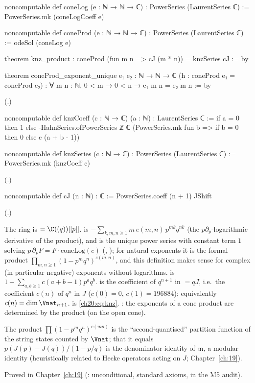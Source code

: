 \begin{leancode}
noncomputable def coneLog (e : ℕ → ℕ → ℂ) : PowerSeries (LaurentSeries ℂ) :=
  PowerSeries.mk (coneLogCoeff e)

noncomputable def coneProd (e : ℕ → ℕ → ℂ) : PowerSeries (LaurentSeries ℂ) :=
  odeSol (coneLog e)

theorem knz_product : coneProd (fun m n => cJ (m * n)) = knzSeries cJ := by

theorem coneProd_exponent_unique {e₁ e₂ : ℕ → ℕ → ℂ} (h : coneProd e₁ = coneProd e₂) :
    ∀ m n : ℕ, 0 < m → 0 < n → e₁ m n = e₂ m n := by
\end{leancode}
(.)
\begin{leancode}
noncomputable def knzCoeff (c : ℕ → ℂ) (a : ℕ) : LaurentSeries ℂ :=
  if a = 0 then 1 else
    -HahnSeries.ofPowerSeries ℤ ℂ (PowerSeries.mk fun b => if b = 0 then 0 else c (a + b - 1))

noncomputable def knzSeries (c : ℕ → ℂ) : PowerSeries (LaurentSeries ℂ) :=
  PowerSeries.mk (knzCoeff c)
\end{leancode}
(.)
\begin{leancode}
noncomputable def cJ (n : ℕ) : ℂ := PowerSeries.coeff (n + 1) JShift
\end{leancode}
(.)
\begin{dictionary}
The ring is  $=\C((q))[[p]]$.   is
$-\sum_{k,m,n\ge1}m\,e(m,n)\,p^{mk}q^{nk}$ (the $p\partial_p$-logarithmic derivative of the product), and 
is the unique power series with constant term $1$ solving $p\,\partial_pF=F\cdot\mathrm{coneLog}(e)$ (,
); for natural exponents it is the formal product $\prod_{m,n\ge1}(1-p^mq^n)^{e(m,n)}$, and this
definition makes sense for complex (in particular negative) exponents without logarithms.   is
$1-\sum_{a,b\ge1}c(a+b-1)p^aq^b$.   is the coefficient of $q^{n+1}$ in  $=qJ$, i.e.\ the coefficient
$c(n)$ of $q^n$ in $J$ ($c(0)=0$, $c(1)=196884$); equivalently $c(n)=\dim\Vnat_{n+1}$.   is
\eqref{ch20:eq:knz}.  : the exponents of a cone product are determined by the product (on the
open cone).
\end{dictionary}
\begin{physics}
The product $\prod(1-p^mq^n)^{c(mn)}$ is the ``second-quantised'' partition function of the string states counted by
$\Vnat$; that it equals $p(J(p)-J(q))/(1-p/q)$ is the denominator identity of $\mathfrak m$, a modular identity
(heuristically related to Hecke operators acting on $J$; Chapter~\ref{ch:19}).
\end{physics}
\begin{status}
Proved in Chapter~\ref{ch:19} (: unconditional, standard axioms, in the M5 audit).
\end{status}

